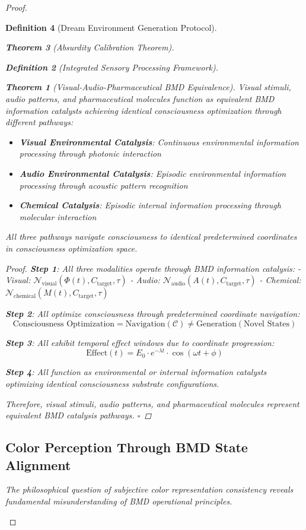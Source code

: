 \documentclass[12pt,a4paper]{article}
\newtheorem{theorem}{Theorem}[section]
\newtheorem{definition}[theorem]{Definition}
\begin{document}
\begin{proof}
\begin{definition}[Dream Environment Generation Protocol]
\begin{theorem}[Absurdity Calibration Theorem]
\begin{observation}
\begin{definition}[Integrated Sensory Processing Framework]
\begin{theorem}[Visual-Audio-Pharmaceutical BMD Equivalence]
Visual stimuli, audio patterns, and pharmaceutical molecules function as equivalent BMD information catalysts achieving identical consciousness optimization through different pathways:
\begin{itemize}
\item \textbf{Visual Environmental Catalysis}: Continuous environmental information processing through photonic interaction
\item \textbf{Audio Environmental Catalysis}: Episodic environmental information processing through acoustic pattern recognition
\item \textbf{Chemical Catalysis}: Episodic internal information processing through molecular interaction
\end{itemize}
All three pathways navigate consciousness to identical predetermined coordinates in consciousness optimization space.
\end{theorem}

\begin{proof}
\textbf{Step 1}: All three modalities operate through BMD information catalysis:
- Visual: $\mathcal{N}_{\text{visual}}(\Phi(t), C_{\text{target}}, \tau)$
- Audio: $\mathcal{N}_{\text{audio}}(A(t), C_{\text{target}}, \tau)$
- Chemical: $\mathcal{N}_{\text{chemical}}(M(t), C_{\text{target}}, \tau)$

\textbf{Step 2}: All optimize consciousness through predetermined coordinate navigation:
$$\text{Consciousness Optimization} = \text{Navigation}(\mathcal{C}) \neq \text{Generation}(\text{Novel States})$$

\textbf{Step 3}: All exhibit temporal effect windows due to coordinate progression:
$$\text{Effect}(t) = E_0 \cdot e^{-\lambda t} \cdot \cos(\omega t + \phi)$$

\textbf{Step 4}: All function as environmental or internal information catalysts optimizing identical consciousness substrate configurations.

Therefore, visual stimuli, audio patterns, and pharmaceutical molecules represent equivalent BMD catalysis pathways. $\square$
\end{proof}

\subsection{Color Perception Through BMD State Alignment}

The philosophical question of subjective color representation consistency reveals fundamental misunderstanding of BMD operational principles.


\end{definition}
\end{observation}
\end{theorem}
\end{definition}
\end{proof}
\end{document}
